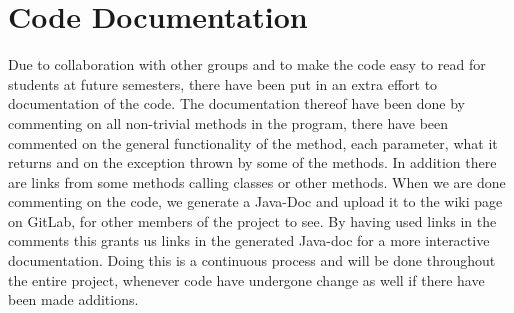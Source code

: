 \section{Code Documentation} \label{sec:code_documentation}
Due to collaboration with other groups and to make the code easy to read for students at future semesters, there have been put in an extra effort to documentation of the code. The documentation thereof have been done by commenting on all non-trivial methods in the program, there have been commented on the general functionality of the method, each parameter, what it returns and on the exception thrown by some of the methods. In addition there are links from some methods calling classes or other methods. When we are done commenting on the code, we generate a Java-Doc and upload it to the wiki page on GitLab, for other members of the project to see. By having used links in the comments this grants us links in the generated Java-doc for a more interactive documentation. 
Doing this is a continuous process and will be done throughout the entire project, whenever code have undergone change as well if there have been made additions.